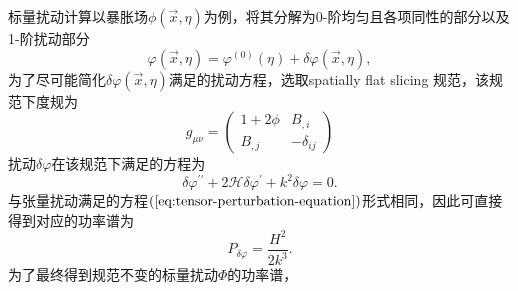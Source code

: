 标量扰动计算以暴胀场$\phi(\vec{x},\eta)$为例，将其分解为0-阶均匀且各项同性的部分以及1-阶扰动部分
\begin{equation}
  \varphi(\vec{x},\eta)=\varphi^{(0)}(\eta)+\delta\varphi(\vec{x},\eta), 
\end{equation}
为了尽可能简化$\delta\varphi(\vec{x},\eta)$满足的扰动方程，选取spatially flat
slicing 规范，该规范下度规为
\begin{equation}
  \label{eq:spatially-flat-slicing-gauge-metric}
  g_{\mu\nu} = \begin{pmatrix}
    1+2\phi & B_{,i} \\
    B_{,j} & -\delta_{ij}
  \end{pmatrix}
\end{equation}
扰动$\delta\varphi$在该规范下满足的方程为
\begin{equation}
  \delta\varphi^{\prime\prime} + 2
  \mathcal{H}\delta\varphi^\prime+k^2\delta\varphi = 0. 
\end{equation}
与张量扰动满足的方程$(\ref{eq:tensor-perturbation-equation})$形式相同，因此可直接得到对应的功率谱为
\begin{equation}
  P_{\delta\varphi}=\frac{H^2}{2k^{3}}. 
\end{equation}
为了最终得到规范不变的标量扰动$\Phi$的功率谱，
